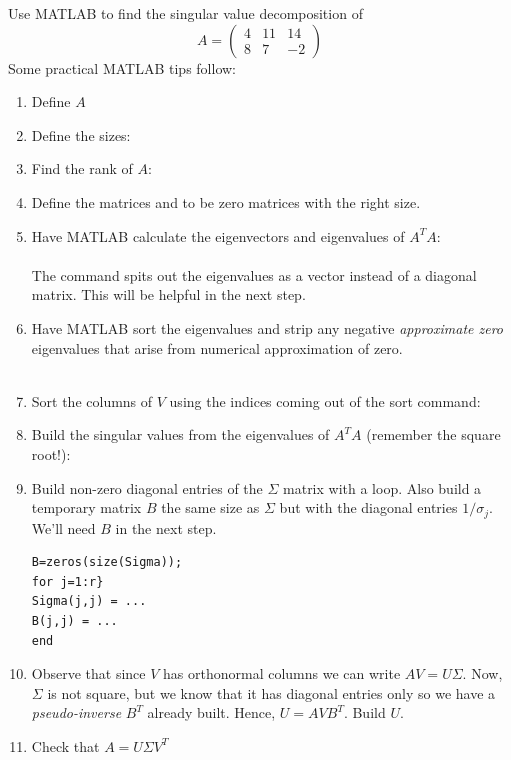\begin{problem}
    Use MATLAB to find the singular value decomposition of 
    \[ A = \begin{pmatrix} 4 & 11 & 14 \\ 8 & 7 & -2 \end{pmatrix} \]
    Some practical MATLAB tips follow:
    \begin{enumerate}
        \item Define $A$
        \item Define the sizes: 
        \item Find the rank of $A$: 
        \item Define the matrices  and  to be zero matrices with
            the right size.
        \item Have MATLAB calculate the eigenvectors and eigenvalues of $A^T A$:\\
            \\
            The  command spits out the eigenvalues as a vector instead of
            a diagonal matrix.  This will be helpful in the next step.
        \item Have MATLAB sort the eigenvalues and strip any negative {\it approximate
            zero} eigenvalues that arise from numerical approximation of zero. \\
            \\
        \item Sort the columns of $V$ using the indices coming out of the sort command: \\
        \item Build the singular values from the eigenvalues of $A^TA$ (remember the
            square root!):\\ 
        \item Build non-zero diagonal entries of the $\Sigma$ matrix with a loop.  Also build a
            temporary matrix $B$ the same size as $\Sigma$ but with the diagonal entries
            $1/\sigma_j$.  We'll need $B$ in the next step. 
\begin{lstlisting}
B=zeros(size(Sigma));
for j=1:r}
Sigma(j,j) = ...
B(j,j) = ...
end
\end{lstlisting}
        \item Observe that since $V$ has orthonormal columns we can write $AV = U \Sigma$.
            Now, $\Sigma$ is not square, but we know that it has diagonal entries only so
            we have a {\it pseudo-inverse} $B^T$ already built.  Hence, $U = A V B^T$.
            Build $U$.
        \item Check that $A = U \Sigma V^T$
    \end{enumerate}
\end{problem}

